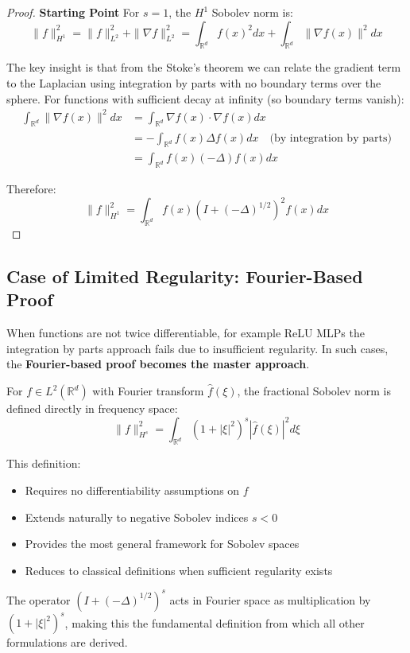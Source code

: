 \documentclass[a4paper]{article}
\theoremstyle{plain}
\theoremstyle{definition}
\theoremstyle{remark}
\begin{document}
\begin{proof}
\textbf{Starting Point}
For $s = 1$, the $H^1$ Sobolev norm is:
\[ \|f\|_{H^1}^2 = \|f\|_{L^2}^2 + \|\nabla f\|_{L^2}^2 = \int_{\mathbb{R}^d} f(x)^2 dx + \int_{\mathbb{R}^d} \|\nabla f(x)\|^2 dx \]

The key insight is that from the Stoke's theorem we can relate the gradient term to the Laplacian using integration by parts with no boundary terms over the sphere. For functions with sufficient decay at infinity (so boundary terms vanish):
\begin{align}
\int_{\mathbb{R}^d} \|\nabla f(x)\|^2 dx &= \int_{\mathbb{R}^d} \nabla f(x) \cdot \nabla f(x) dx \\
&= -\int_{\mathbb{R}^d} f(x) \Delta f(x) dx \quad \text{(by integration by parts)} \\
&= \int_{\mathbb{R}^d} f(x) (-\Delta) f(x) dx
\end{align}

Therefore:
\[ \|f\|_{H^1}^2 = \int_{\mathbb{R}^d} f(x) (I + (-\Delta)^{1/2})^2 f(x) dx \]

\end{proof}

\subsection{Case of Limited Regularity: Fourier-Based Proof}
\begin{tcolorbox}[colback=green!10,colframe=green!50!black,title=Remark: Non sufficient regularity]
When functions are not twice differentiable, for example ReLU MLPs the integration by parts approach fails due to insufficient regularity. 
In such cases, the \textbf{Fourier-based proof becomes the master approach}.

For $f \in L^2(\mathbb{R}^d)$ with Fourier transform $\hat{f}(\xi)$, the fractional Sobolev norm is defined directly in frequency space:
\[ \|f\|_{H^s}^2 = \int_{\mathbb{R}^d} (1 + |\xi|^2)^s |\hat{f}(\xi)|^2 d\xi \]

This definition:
\begin{itemize}
\item Requires no differentiability assumptions on $f$
\item Extends naturally to negative Sobolev indices $s < 0$
\item Provides the most general framework for Sobolev spaces
\item Reduces to classical definitions when sufficient regularity exists
\end{itemize}

The operator $(I + (-\Delta)^{1/2})^s$ acts in Fourier space as multiplication by $(1 + |\xi|^2)^s$, making this the fundamental definition from which all other formulations are derived.
\end{tcolorbox}
\end{document}
